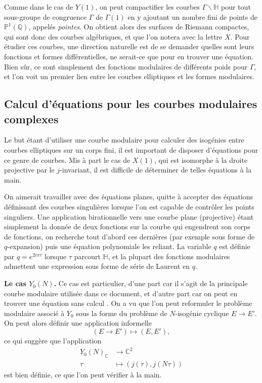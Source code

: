 \documentclass[11pt,a4paper]{article}
\newcommand{\C}{\mathbb{C}}
\newcommand{\Q}{\mathbb{Q}}
\renewcommand{\H}{\mathbb{H}}
\renewcommand{\P}{\mathbb{P}}
\renewcommand{\b}{\backslash}
\newcommand{\vers}{\longrightarrow}
\renewcommand{\v}{\vspace{5mm}}
\theoremstyle{definition}
\begin{document}
Comme dans le cas de $Y(1)$, on peut compactifier les courbes $\Gamma \b\H$ pour tout sous-groupe de congruence $\Gamma$ de $\Gamma(1)$ en y ajoutant un nombre fini de points de $\P^1(\Q)$, appelés \emph{pointes}. On obtient alors des surfaces de Riemann compactes, qui sont donc des courbes algébriques, et que l'on notera avec la lettre $X$. Pour étudier ces courbes, une direction naturelle est de se demander quelles sont leurs fonctions et formes différentielles, ne serait-ce que pour en trouver une équation. Bien sûr, ce sont simplement des fonctions modulaires de différents poids pour $\Gamma$, et l'on voit un premier lien entre les courbes elliptiques et les formes modulaires.

\subsection{Calcul d'équations pour les courbes modulaires complexes}


Le but étant d'utiliser une courbe modulaire pour calculer des isogénies entre courbes elliptiques sur un corps fini, il est important de disposer d'équations pour ce genre de courbes. Mis à part le cas de $X(1)$, qui est isomorphe à la droite projective par le $j$-invariant, il est difficile de déterminer de telles équations à la main.

On aimerait travailler avec des équations planes, quitte à accepter des équations définissant des courbes singulières lorsque l'on est capable de contrôler les points singuliers. Une application birationnelle vers une courbe plane (projective) étant simplement la donnée de deux fonctions sur la courbe qui engendrent son corps de fonctions, on recherche tout d'abord ces dernières (par exemple sous forme de $q$-expansion) puis une équation polynomiale les reliant. La variable $q$ est définie par $q = e^{2i\pi\tau}$ lorsque $\tau$ parcourt $\H$, et la plupart des fonctions modulaires admettent une expression sous forme de série de Laurent en $q$.
\v

\textbf{Le cas $Y_0(N)$.} Ce cas est particulier, d'une part car il s'agit de la principale courbe modulaire utilisée dans ce document, et d'autre part car on peut en trouver une équation \og sans calcul \fg. On a vu que l'on peut reformuler le problème modulaire associé à $Y_0$ sous la forme du problème de $N$-isogénie cyclique $E\to E'$. On peut alors définir une application informelle
$$(E\to E') \longmapsto (E, E'),$$
ce qui suggère que l'application
$$\begin{aligned}
Y_0(N)_\C &\vers \C^2 \\
 \tau &\longmapsto (j(\tau), j(N\tau))
\end{aligned}$$
est bien définie, ce que l'on peut vérifier à la main.
\end{document}
